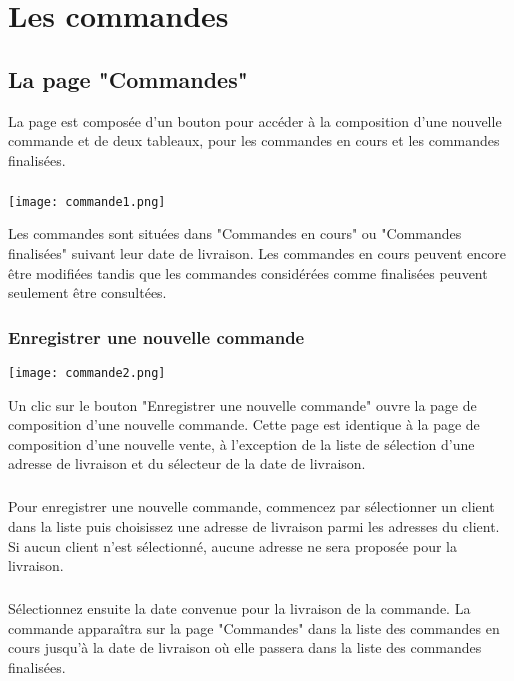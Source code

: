 \chapter{Les commandes}

\section{La page "Commandes"}
La page est composée d'un bouton pour accéder à la composition d'une nouvelle
commande et de deux tableaux, pour les commandes en cours et les commandes
finalisées.

\paragraph{}

\texttt{[image: commande1.png]}

Les commandes sont situées dans "Commandes en cours" ou "Commandes finalisées"
suivant leur date de livraison. Les commandes en cours peuvent encore être
modifiées tandis que les commandes considérées comme finalisées peuvent
seulement être consultées.

\subsection{Enregistrer une nouvelle commande}

\texttt{[image: commande2.png]}

Un clic sur le bouton "Enregistrer une nouvelle commande" ouvre la page de
composition d'une nouvelle commande. Cette page est identique à la page de
composition d'une nouvelle vente, à l'exception de la liste de sélection
d'une adresse de livraison et du sélecteur de la date de livraison.

\paragraph{}
Pour enregistrer une nouvelle commande, commencez par sélectionner un client
dans la liste puis choisissez une adresse de livraison parmi les adresses du
client. Si aucun client n'est sélectionné, aucune adresse ne sera
proposée pour la livraison.

\paragraph{}
Sélectionnez ensuite la date convenue pour la livraison de la commande.
La commande apparaîtra sur la page "Commandes" dans la liste des commandes en
cours jusqu'à la date de livraison où elle passera dans la liste des commandes
finalisées.


